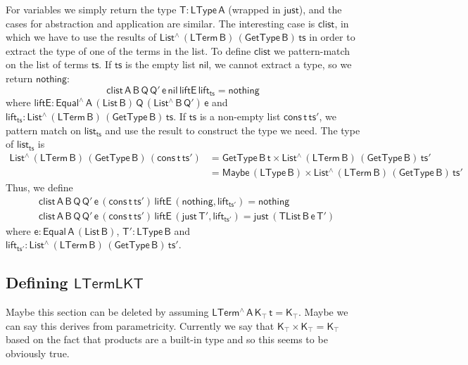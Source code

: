 \documentclass[9pt]{entcs}
\begin{document}
For variables we simply return the type $\mathsf{T : LType\, A}$ (wrapped in $\mathsf{just}$), 
and the cases for abstraction and application are similar.
The interesting case is $\mathsf{clist}$, in which we have to use 
the results of $\mathsf{List^{\wedge}\, (LTerm\, B)\, (GetType\, B)\, ts}$
in order to extract the type of one of the terms in the list. 
To define $\mathsf{clist}$ we pattern-match on the list of terms $\mathsf{ts}$.
If $\mathsf{ts}$ is the empty list $\mathsf{nil}$, we cannot extract a type, 
so we return $\mathsf{nothing}$:
\[
  \mathsf{clist\, A\, B\, Q\, Q'\, e\, nil \, liftE\, lift_{ts} = nothing}
\]
where $\mathsf{liftE : Equal^{\wedge}\, A\, (List\,B) \, Q\, (List^{\wedge}\, B\, Q')\, e}$
and $\mathsf{lift_{ts} : List^{\wedge}\, (LTerm\, B)\, (GetType\, B)\, ts}$.
If $\mathsf{ts}$ is a non-empty list $\mathsf{cons\,t\,ts'}$,
we pattern match on $\mathsf{list_{ts}}$ and use the result to construct the type we need.
The type of $\mathsf{list_{ts}}$ is
\begin{align*}
\mathsf{List^{\wedge}\, (LTerm\, B)\, (GetType\, B)\, (cons\, t\, ts')}
&= \mathsf{GetType\, B\, t \times List^{\wedge}\, (LTerm\, B)\, (GetType\, B)\, ts'} \\
&= \mathsf{Maybe\, (LType\, B) \times List^{\wedge}\, (LTerm\, B)\, (GetType\, B)\, ts'}
\end{align*}
Thus, we define
\begin{align*}
  &\mathsf{clist\, A\, B\, Q\, Q'\, e\, (cons\, t\, ts') \, liftE\, (nothing , lift_{ts'}) = nothing} \\
  &\mathsf{clist\, A\, B\, Q\, Q'\, e\, (cons\, t\, ts') \, liftE\, (just\, T' , lift_{ts'}) = just \, (TList\, B\, e\, T')}
\end{align*}
where $\mathsf{e : Equal\, A\, (List\,B)}$, $\mathsf{T' : LType\, B}$
and $\mathsf{lift_{ts'} : List^{\wedge}\, (LTerm\, B)\, (GetType\, B)\, ts'}$. 



\subsection{Defining $\mathsf{LTermLKT}$}

{\color{red} Maybe this section can be deleted by assuming $\mathsf{LTerm^{\wedge}\, A\, K_\top\,t = K_\top}$.
Maybe we can say this derives from parametricity.
Currently we say that $\mathsf{K_\top \times K_\top = K_\top}$ based on the fact that products are a built-in type and so this seems to be obviously true.}
\end{document}
